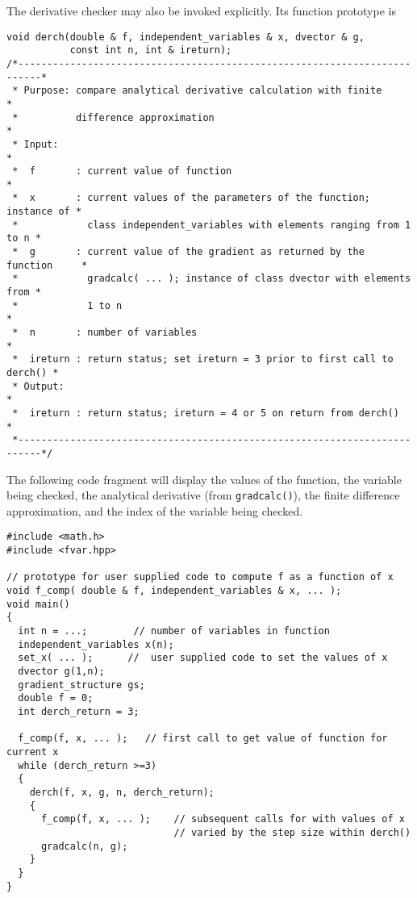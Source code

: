 \documentclass{admbmanual}
\begin{document}
The derivative checker may also be invoked explicitly. Its function prototype is
\begin{lstlisting}[escapechar=\%]
void derch(double & f, independent_variables & x, dvector & g,
           const int n, int & ireturn);
/*--------------------------------------------------------------------------*
 * Purpose: compare analytical derivative calculation with finite           *
 *          difference approximation                                        *
 * Input:                                                                   *
 *  f       : current value of function                                     *
 *  x       : current values of the parameters of the function; instance of *
 *            class independent_variables with elements ranging from 1 to n *
 *  g       : current value of the gradient as returned by the function     *
 *            gradcalc( ... ); instance of class dvector with elements from *
 *            1 to n                                                        *
 *  n       : number of variables                                           *
 *  ireturn : return status; set ireturn = 3 prior to first call to derch() *
 * Output:                                                                  *
 *  ireturn : return status; ireturn = 4 or 5 on return from derch()        *
 *--------------------------------------------------------------------------*/
\end{lstlisting}

The following code fragment will display the values of the function, the
variable being checked, the analytical derivative (from \texttt{gradcalc()}),
the finite difference approximation, and the index of the variable being
checked.
\begin{lstlisting}
#include <math.h>
#include <fvar.hpp>

// prototype for user supplied code to compute f as a function of x
void f_comp( double & f, independent_variables & x, ... );
void main()
{
  int n = ...;        // number of variables in function
  independent_variables x(n);
  set_x( ... );      //  user supplied code to set the values of x
  dvector g(1,n);
  gradient_structure gs;
  double f = 0;
  int derch_return = 3;

  f_comp(f, x, ... );   // first call to get value of function for current x
  while (derch_return >=3)
  {
    derch(f, x, g, n, derch_return);
    {
      f_comp(f, x, ... );    // subsequent calls for with values of x
                             // varied by the step size within derch()
      gradcalc(n, g);
    }
  }
}
\end{lstlisting}
\end{document}
